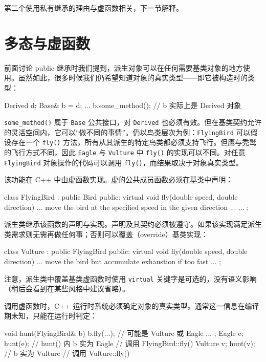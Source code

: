 第二个使用私有继承的理由与虚函数相关，下一节解释。

\section{多态与虚函数}

前面讨论 public 继承时我们提到，派生对象可以在任何需要基类对象的地方使用。虽然如此，很多时候我们仍希望知道对象的真实类型——即它被构造时的类型：

\begin{code}
Derived d;
Base& b = d;
...
b.some_method(); // b 实际上是 Derived 对象
\end{code}

\texttt{some\_method()} 属于 \texttt{Base} 公共接口，对 \texttt{Derived} 也必须有效。但在基类契约允许的灵活空间内，它可以“做不同的事情”。仍以鸟类层次为例：\texttt{FlyingBird} 可以假设存在一个 \texttt{fly()} 方法，所有从其派生的特定鸟类都必须支持飞行。但鹰与秃鹫的飞行方式不同，因此 \texttt{Eagle} 与 \texttt{Vulture} 中 \texttt{fly()} 的实现可以不同。对任意 \texttt{FlyingBird} 对象操作的代码可以调用 \texttt{fly()}，而结果取决于对象真实类型。

该功能在 C++ 中由虚函数实现。虚的公共成员函数必须在基类中声明：

\begin{code}
class FlyingBird : public Bird {
  public:
  virtual void fly(double speed, double direction) {
    ... move the bird at the specified speed
        in the given direction ...
  }
  ...
};
\end{code}

派生类继承该函数的声明与实现。声明及其契约必须被遵守。如果该实现满足派生类需求则无需再做任何事；否则可以覆盖（override）基类实现：

\begin{code}
class Vulture : public FlyingBird {
  public:
  virtual void fly(double speed, double direction) {
    ... move the bird but accumulate
        exhaustion if too fast ...
  }
};
\end{code}

注意，派生类中覆盖基类虚函数时使用 \texttt{virtual} 关键字是可选的，没有语义影响（稍后会看到在某些风格中建议省略）。

调用虚函数时，C++ 运行时系统必须确定对象的真实类型。通常这一信息在编译期未知，只能在运行时判定：

\begin{code}
void hunt(FlyingBird& b) {
  b.fly(...);    // 可能是 Vulture 或 Eagle
  ...
};
Eagle e;
hunt(e);   // hunt() 内 b 实为 Eagle
           // 调用 FlyingBird::fly()
Vulture v;
hunt(v);   // b 实为 Vulture
           // 调用 Vulture::fly()
\end{code}

